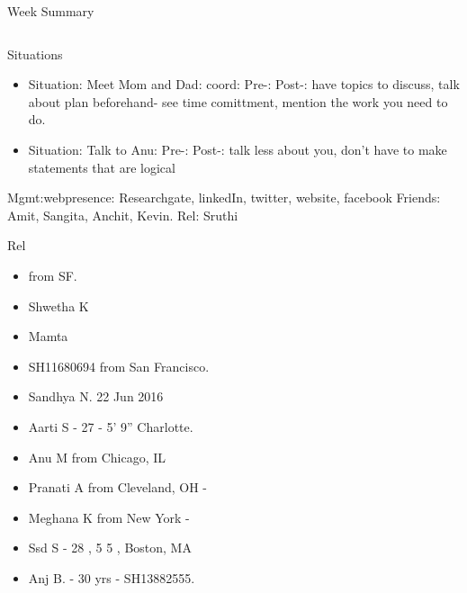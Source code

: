 \documentclass[serif, mathserif, final]{beamer}
\begin{document}
\begin{frame}
\begin{columns}
\begin{column}{0.5\linewidth}
\begin{block}{Week Summary}
\begin{column}{0.25\linewidth}
      \begin{block}{Situations}

        \begin{itemize}
          \tiny \item \tiny Situation: Meet Mom and Dad:  coord:
          Pre-:  Post-: have topics to discuss, talk about plan
          beforehand- see time comittment, mention the work you need to do.  
      
          
        \item \tiny Situation: Talk to Anu:  Pre-:   Post-:  talk less
          about you, don't have to make statements that are logical 
 
        \end{itemize} 
      \end{block}


\begin{block}
  Mgmt:webpresence:
  Researchgate, linkedIn, twitter, website, facebook
  Friends: Amit, Sangita, Anchit, Kevin.
  Rel: Sruthi
\end{block}

\begin{block}{Rel} 
  \begin{itemize} 
    \small \item \small  from SF. 
    \item \small Shwetha K 
    \item \small Mamta       
    \item \small SH11680694 from San Francisco. 
    \item \small Sandhya N. 22 Jun 2016 
    \item \small Aarti S - 27 - 5' 9'' Charlotte.       
    \item \small Anu M from Chicago, IL 
    \item \small Pranati A from Cleveland, OH - 
    \item \small Meghana K from New York - 
    \item \small Ssd S - 28 , 5 5 , Boston, MA 
    \item \small Anj B. - 30 yrs - SH13882555.
  \end{itemize} 


\end{block}
\end{column}
\end{block}
\end{column}
\end{columns}
\end{frame}
\end{document}
